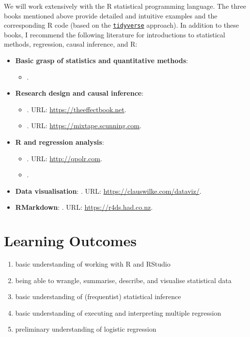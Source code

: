 \documentclass[abstract=on,parskip=full,headings=standardclasses,fontsize=11pt,paper=a4]{scrartcl}
\begin{document}
We will work extensively with the \textsf{R} statistical programming language. The three books mentioned above \autocite{ismay20,wickham17,healy19}   provide detailed and intuitive examples and the corresponding \textsf{R} code (based on the \href{https://www.tidyverse.org}{\texttt{tidyverse}} approach). In addition to these books, I recommend the following literature for introductions to statistical methods, regression, causal inference, and \textsf{R}:

\begin{itemize}
\item \textbf{Basic grasp of statistics and quantitative methods}: 
\begin{itemize}
\item {}.
\end{itemize}

\item \textbf{Research design and causal inference}: 
\begin{itemize}
\item {}. URL: \url{https://theeffectbook.net}.
\item {}. URL: \url{https://mixtape.scunning.com}.
\end{itemize}
\item \textbf{\textsf{R} and regression analysis}: 
\begin{itemize}
\item {}. URL: \url{http://qpolr.com}.
\item {}.
\end{itemize}
\item \textbf{Data visualisation}: . URL: \url{https://clauswilke.com/dataviz/}.
\item \textbf{RMarkdown}: . URL: \url{https://r4ds.had.co.nz}.
\end{itemize}

\section*{Learning Outcomes}

\begin{enumerate}
\item basic understanding of working with \textsf{R} and RStudio
\item being able to wrangle, summarise, describe, and visualise statistical data
\item  basic understanding of (frequentist) statistical inference
\item  basic understanding of executing and interpreting multiple regression
\item  preliminary understanding of logistic regression
\end{enumerate}
\end{document}
